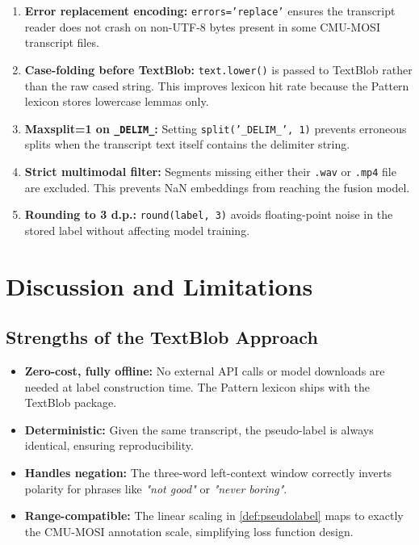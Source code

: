 \documentclass[12pt,a4paper]{article}
\theoremstyle{plain}
\theoremstyle{definition}
\begin{document}
\begin{enumerate}[label=(\arabic*)]
  \item \textbf{Error replacement encoding:} \texttt{errors='replace'}
        ensures the transcript reader does not crash on non-UTF-8
        bytes present in some CMU-MOSI transcript files.

  \item \textbf{Case-folding before TextBlob:}
        \texttt{text.lower()} is passed to TextBlob rather than the
        raw cased string.  This improves lexicon hit rate because
        the Pattern lexicon stores lowercase lemmas only.

  \item \textbf{Maxsplit=1 on \texttt{\_DELIM\_}:}
        Setting \texttt{split('\_DELIM\_', 1)} prevents erroneous
        splits when the transcript text itself contains the delimiter
        string.

  \item \textbf{Strict multimodal filter:}
        Segments missing either their \texttt{.wav} or \texttt{.mp4}
        file are excluded.  This prevents NaN embeddings from
        reaching the fusion model.

  \item \textbf{Rounding to 3 d.p.:}
        \texttt{round(label, 3)} avoids floating-point noise in
        the stored label without affecting model training.
\end{enumerate}

\section{Discussion and Limitations}
\label{sec:discussion}

\subsection{Strengths of the TextBlob Approach}

\begin{itemize}
  \item \textbf{Zero-cost, fully offline:} No external API calls or
        model downloads are needed at label construction time.  The
        Pattern lexicon ships with the TextBlob package.
  \item \textbf{Deterministic:} Given the same transcript, the
        pseudo-label is always identical, ensuring reproducibility.
  \item \textbf{Handles negation:} The three-word left-context window
        correctly inverts polarity for phrases like \emph{"not good"}
        or \emph{"never boring"}.
  \item \textbf{Range-compatible:} The linear scaling in
        \cref{def:pseudolabel} maps to exactly the CMU-MOSI annotation
        scale, simplifying loss function design.
\end{itemize}
\end{document}
